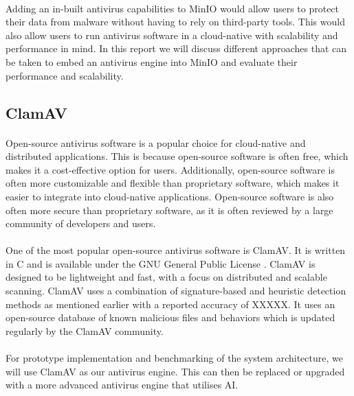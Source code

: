 \documentclass[12pt, conference, final, a4paper, onecolumn, compsoc]{IEEEtran}
\begin{document}
    \paragraph{}
    Adding an in-built antivirus capabilities to MinIO would allow users to
    protect their data from malware without having to rely on third-party tools.
    This would also allow users to run antivirus software in a cloud-native with
    scalability and performance in mind. In this report we will discuss
    different approaches that can be taken to embed an antivirus engine into
    MinIO and evaluate their performance and scalability.

    \subsection*{ClamAV}

    \paragraph{}
    Open-source antivirus software is a popular choice for cloud-native and
    distributed applications. This is because open-source software is often
    free, which makes it a cost-effective option for users. Additionally,
    open-source software is often more customizable and flexible than
    proprietary software, which makes it easier to integrate into cloud-native
    applications. Open-source software is also often more secure than
    proprietary software, as it is often reviewed by a large community of
    developers and users.

    \paragraph{}
    One of the most popular open-source antivirus software is ClamAV. It is
    written in C and is available under the GNU General Public License
    \citep{clamav-repo}. ClamAV is designed to be lightweight and fast, with a
    focus on distributed and scalable scanning. ClamAV uses a combination of
    signature-based and heuristic detection methods as mentioned earlier with a
    reported accuracy of XXXXX. It uses an open-source database of known
    malicious files and behaviors which is updated regularly by the ClamAV
    community.

    \paragraph{}
    For prototype implementation and benchmarking of the system architecture, we
    will use ClamAV as our antivirus engine. This can then be replaced or
    upgraded with a more advanced antivirus engine that utilises AI.
\end{document}
